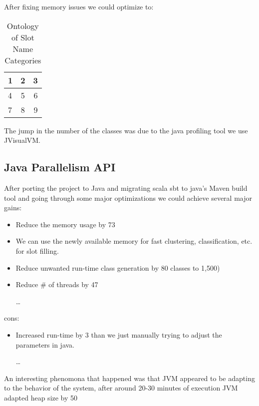 After fixing memory issues we could optimize to:

\begin{table}
\caption{Ontology of Slot Name Categories }
\centering
\begin{tabular}[c]{ |l| c |r| } \hline
  1 & 2 & 3 \\\hline
  4 & 5 & 6 \\\hline
  7 & 8 & 9 \\\hline
\end{tabular}
\end{table}

The jump in the number of the classes was due to the java profiling tool we use JVisualVM.

\subsection{ Java Parallelism API}

After porting the project to Java and migrating scala sbt to java's Maven build tool and going through some major optimizations we could achieve several major gains:

\begin{itemize}
  \item Reduce the memory usage by 73%
  \item  We can use the newly available memory for fast clustering, classification, etc. for slot filling.
  \item Reduce unwanted run-time class generation by 80%
   classes to 1,500)
   \item Reduce \# of threads by 47%
   
    \ldots
\end{itemize}

cons:

\begin{itemize}
  \item Increased run-time by 3%
   than we just manually trying to adjust the parameters in java.

    \ldots
\end{itemize}


An interesting phenomona that happened was that JVM appeared to be adapting to the behavior of the system, after around 20-30 minutes of execution JVM adapted heap size by 50%

